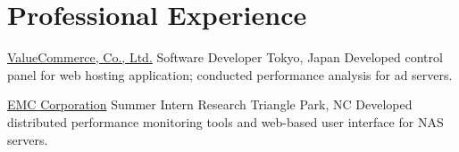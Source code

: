\section{Professional Experience}
		{\href{http://valuecommerce.com}{ValueCommerce, Co., Ltd.}}
		{Software Developer}
		{Tokyo, Japan}{}
		{Developed control panel for web hosting application; conducted 
		 performance analysis for ad servers.}

		{\href{http://www.emc.com}{EMC Corporation}}
		{Summer Intern}
		{Research Triangle Park, NC}{}
		{Developed distributed performance monitoring tools and 
		 web-based user interface for NAS servers.}



